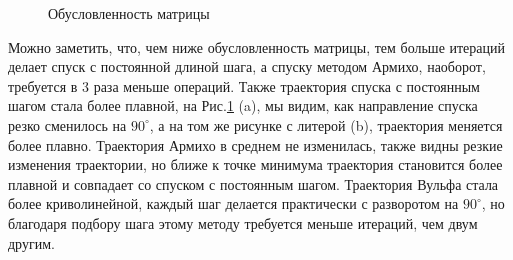 \documentclass{article}
\begin{document}
	\begin{figure}[H]
		\centering
		\hfill %
		\caption{Обусловленность матрицы}
		\label{fig:obyslovlenn}
	\end{figure}
	
	\newpage
	Можно заметить, что, чем ниже обусловленность матрицы, тем больше итераций делает спуск с постоянной длиной шага, а спуску методом Армихо, наоборот, требуется в 3 раза меньше операций.
	Также траектория спуска с постоянным шагом стала более плавной, на Рис.\ref{fig:obyslovlenn} (a), мы видим, как направление спуска резко сменилось на $90^{\circ}$, а на том же рисунке с литерой (b), траектория меняется более плавно. Траектория Армихо в среднем не изменилась, также видны резкие изменения траектории, но ближе к точке минимума траектория становится более плавной и совпадает со спуском с постоянным шагом. Траектория Вульфа стала более криволинейной, каждый шаг делается практически с разворотом на $90^{\circ}$, но благодаря подбору шага этому методу требуется меньше итераций, чем двум другим.
	
\end{document}

